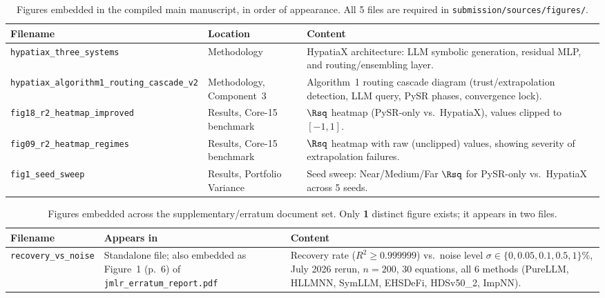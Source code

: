 
\begin{table}[H]
\centering
\caption{Figures embedded in the compiled main manuscript, in order of
  appearance. All 5 files are required in \texttt{submission/sources/figures/}.}
\label{tab:figlist_main}
\small
\renewcommand{\arraystretch}{1.25}
\begin{tabular}{L{5.2cm} L{3.0cm} L{5.3cm}}
\toprule
\textbf{Filename} & \textbf{Location} & \textbf{Content}\\
\midrule
\texttt{hypatiax\_three\_systems} &
  Methodology &
  HypatiaX architecture: LLM symbolic generation, residual MLP, and
  routing/ensembling layer.\\
\texttt{hypatiax\_algorithm1\_routing\_cascade\_v2} &
  Methodology, Component~3 &
  Algorithm~1 routing cascade diagram (trust/extrapolation detection,
  LLM query, PySR phases, convergence lock).\\
\texttt{fig18\_r2\_heatmap\_improved} &
  Results, Core-15 benchmark &
  $\Rsq$ heatmap (PySR-only vs.\ HypatiaX), values clipped to
  $[-1,1]$.\\
\texttt{fig09\_r2\_heatmap\_regimes} &
  Results, Core-15 benchmark &
  $\Rsq$ heatmap with raw (unclipped) values, showing severity of
  extrapolation failures.\\
\texttt{fig1\_seed\_sweep} &
  Results, Portfolio Variance &
  Seed sweep: Near/Medium/Far $\Rsq$ for PySR-only vs.\ HypatiaX
  across 5 seeds.\\
\bottomrule
\end{tabular}
\end{table}

\begin{table}[H]
\centering
\caption{Figures embedded across the supplementary/erratum document set. Only
  \textbf{1} distinct figure exists; it appears in two files.}
\label{tab:figlist_supplementary}
\small
\renewcommand{\arraystretch}{1.25}
\begin{tabular}{L{5.2cm} L{3.6cm} L{5.3cm}}
\toprule
\textbf{Filename} & \textbf{Appears in} & \textbf{Content}\\
\midrule
\texttt{recovery\_vs\_noise} &
  Standalone file; also embedded as Figure~1 (p.~6) of
  \texttt{jmlr\_erratum\_report.pdf} &
  Recovery rate ($R^2\ge0.999999$) vs.\ noise level $\sigma\in\{0,0.05,0.1,
  0.5,1\}\%$, July 2026 rerun, $n{=}200$, 30 equations, all 6 methods
  (PureLLM, HLLMNN, SymLLM, EHSDeFi, HDSv50\_2, ImpNN).\\
\bottomrule
\end{tabular}
\end{table}

